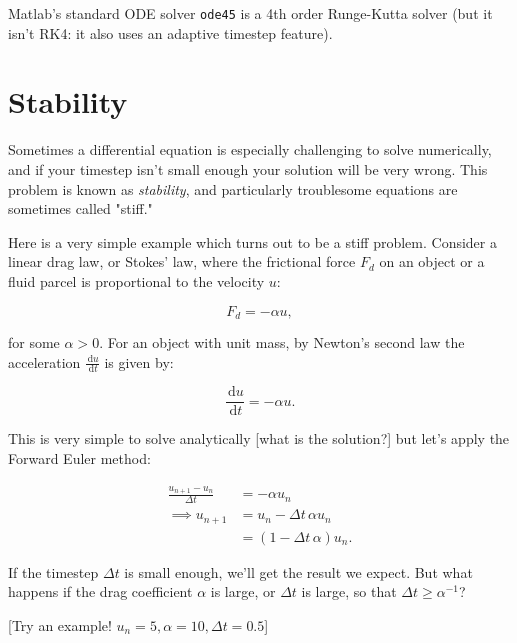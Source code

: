 \documentclass{article}
\newcommand{\ud}{\,\mathrm{d}}
\newcommand{\dt}{\Delta t}
\newcommand{\uni}{u_{n+1}}
\begin{document}

Matlab's standard ODE solver \texttt{ode45} is a 4th order Runge-Kutta solver
(but it isn't RK4: it also uses an adaptive timestep feature).

\section{Stability}

Sometimes a differential equation is especially challenging to solve numerically,
and if your timestep isn't small enough your solution will be very wrong.
This problem is known as \emph{stability}, and particularly troublesome
equations are sometimes called "stiff."

Here is a very simple example which turns out to be a stiff problem.
Consider a linear drag law, or Stokes' law,
where the frictional force $F_d$ on an object or a fluid parcel is proportional to the velocity $u$:

\begin{equation}
    F_d = -\alpha u,
    \label{stokes}
\end{equation}

for some $\alpha > 0$.
For an object with unit mass, by Newton's second law the acceleration $\tfrac{\ud u}{\ud t}$ is 
given by:

\begin{equation}
    \frac{\ud u}{\ud t} = -\alpha u.
\end{equation}

This is very simple to solve analytically [what is the solution?]
but let's apply the Forward Euler method:

\begin{equation}
    \begin{aligned}
        \frac{\uni - u_n}{\dt} &= -\alpha u_n \\
        \implies \uni &= u_n - \dt\,\alpha u_n \\
                 {} &= (1 - \dt\,\alpha) u_n.
    \end{aligned}
    \label{dragexp}
\end{equation}

If the timestep $\dt$ is small enough, we'll get the result we expect.
But what happens if the drag coefficient $\alpha$ is large, or $\dt$ is large,
so that $\dt \geq \alpha^{-1}$?

[Try an example! $u_n = 5, \alpha = 10, \dt = 0.5$]
\end{document}
